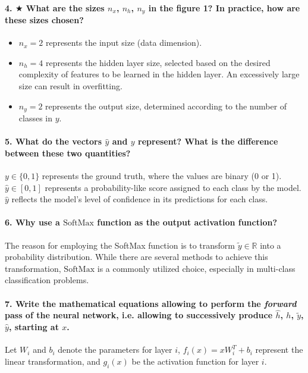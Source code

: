 \paragraph{4. $\bigstar$ What are the sizes $n_x$, $n_h$, $n_y$ in the figure 1? In practice, how are these sizes chosen?}
\begin{itemize}
    \item $n_x = 2$ represents the input size (data dimension).
    \item $n_h = 4$ represents the hidden layer size, selected based on the desired complexity of features to be learned in the hidden layer. An excessively large size can result in overfitting.
    \item $n_y = 2$ represents the output size, determined according to the number of classes in $y$.
\end{itemize}

\paragraph{5. What do the vectors $\hat{y}$ and $y$ represent? What is the difference between these two quantities?}
$y \in \{0,1\}$ represents the ground truth, where the values are binary (0 or 1).
$\hat{y} \in [0,1]$ represents a probability-like score assigned to each class by the model. $\hat{y}$ reflects the model's level of confidence in its predictions for each class.

\paragraph{6. Why use a $\text{SoftMax}$ function as the output activation function?}
The reason for employing the SoftMax function is to transform $\tilde{y} \in \mathbb{R}$ into a probability distribution. While there are several methods to achieve this transformation, $\text{SoftMax}$ is a commonly utilized choice, especially in multi-class classification problems.

\paragraph{7. Write the mathematical equations allowing to perform the \textit{forward} pass of the neural network, i.e. allowing to successively produce $\hat{h}$, $ h $, $ \tilde{y} $, $ \hat{y} $, starting at $x$.}
Let $W_i$ and $b_i$ denote the parameters for layer $i$, $f_i(x) = x W_i ^T + b_i$ represent the linear transformation, and $g_i(x)$ be the activation function for layer $i$.

